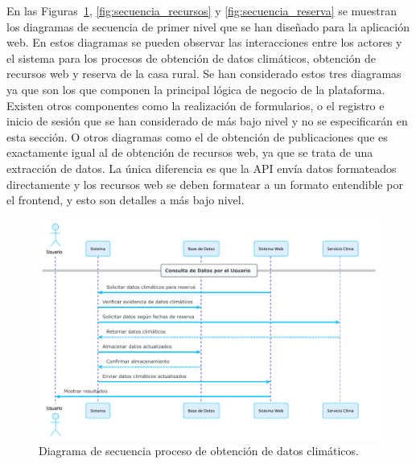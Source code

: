 En las Figuras~\ref{fig:secuencia_clima}, \ref{fig:secuencia_recursos} y \ref{fig:secuencia_reserva} se muestran los diagramas de secuencia de primer nivel que se han diseñado para la aplicación web. En estos diagramas se pueden observar las interacciones entre los actores y el sistema para los procesos de obtención de datos climáticos, obtención de recursos web y reserva de la casa rural. Se han considerado estos tres diagramas ya que son los que componen la principal lógica de negocio de la plataforma. Existen otros componentes como la realización de formularios, o el registro e inicio de sesión que se han considerado de más bajo nivel y no se especificarán en esta sección. O otros diagramas como el de obtención de publicaciones que es exactamente igual al de obtención de recursos web, ya que se trata de una extracción de datos. La única diferencia es que la \gls{API} envía datos formateados directamente y los recursos web se deben formatear a un formato entendible por el \gls{frontend}, y esto son detalles a más bajo nivel.
\begin{figure}[h!tb]
    \centering
    
    \includegraphics [width=1\textwidth]{figs/clima_alto.pdf}
    \caption{Diagrama de secuencia proceso de obtención de datos climáticos.\label{fig:secuencia_clima}}
   
\end{figure}

